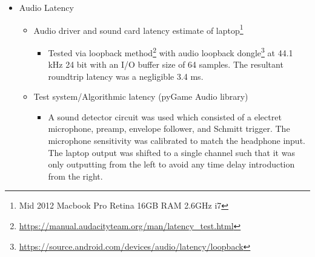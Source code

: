 \begin{itemize}
\begin{itemize}
        \begin{figure}[H]
            \centering
            \texttt{[image: diagramGateHaptic]}
            \caption{Diagram of gate versus actual onset}
        \end{figure}
        \begin{itemize}
            \item Onset trigger in continuous mode 2/9ths (5/9-3/9) of the period. For a 1000 ms period the onset transmission does not occur until 2/9 * 1000 = 222.222 ms as confirmed in Figure \ref{hapticAdjustment}.
            \begin{figure}[H]\label{hapticAdjustment}
                \centering
                \texttt{[image: hapticAdjustment]}
                \caption{Haptic correction factor based on gate opening vs. actual onset message}
            \end{figure}
            \item The onset trigger in discrete mode starts $1/4$ of a period after.
        \end{itemize}
    \end{itemize}
    \item Audio Latency
    \begin{itemize}
        \item Audio driver and sound card latency estimate of laptop\footnote{Mid 2012 Macbook Pro Retina 16GB RAM 2.6GHz i7}
        \begin{itemize}
            \item Tested via loopback method\footnote{\url{https://manual.audacityteam.org/man/latency_test.html}} with audio loopback dongle\footnote{\url{https://source.android.com/devices/audio/latency/loopback}} at 44.1 kHz 24 bit with an I/O buffer size of 64 samples. The resultant roundtrip latency was a negligible 3.4 ms.
        \end{itemize}
        \item Test system/Algorithmic latency (pyGame Audio library)
        \begin{itemize}
            \item A sound detector circuit was used which consisted of a electret microphone, preamp, envelope follower, and Schmitt trigger. The microphone sensitivity was calibrated to match the headphone input. The laptop output was shifted to a single channel such that it was only outputting from the left to avoid any time delay introduction from the right. 

\end{itemize}
\end{itemize}
\end{itemize}
